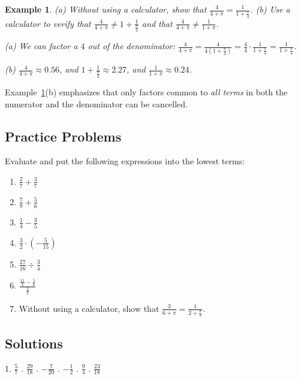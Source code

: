 \documentclass[11pt]{book}               %
\newtheorem{example}{Example}
\begin{document}
\begin{example}\label{dontcancle}
(a) Without using a calculator, show that $\frac{4}{4+\pi}=\frac{1}{1+\frac{\pi}{4}}$. (b) Use a calculator to verify that $\frac{4}{4+\pi}\neq 1 + \displaystyle\frac{1}{\frac{\pi}{4}}$ and that $\frac{4}{4+\pi}\neq\frac{1}{1+\pi}$.

\normalfont
(a) We can factor a $4$ out of the denominator: $\frac{4}{4+\pi}=\frac{4}{4\left(1+\frac{\pi}{4}\right)}=\frac{4}{4}\cdot\frac{1}{1+\frac{\pi}{4}} = \frac{1}{1+\frac{\pi}{4}}$.

(b) $\frac{4}{4+\pi}\approx 0.56$, and $1+\frac{1}{\frac{\pi}{4}}\approx2.27$, and $\frac{1}{1+\pi}\approx0.24$.
\end{example}

Example~\ref{dontcancle}(b) emphasizes that only factors common to \emph{all terms} in both the numerator and the denominator can be cancelled.

\subsection{Practice Problems}

Evaluate and put the following expressions into the lowest terms:
\begin{enumerate}
\item $ \frac{2}{7} + \frac{3}{7} $ 
\item $ \frac{7}{9} + \frac{5}{6} $ 
\item $ \frac{1}{4} - \frac{3}{5} $ 
\item $ \frac{3}{2} \cdot \left(-\frac{5}{15}\right) $ 
\item $ \frac{27}{16} \div \frac{3}{4} $ 
\item $\displaystyle \frac{\frac{11}{4} - \frac{5}{6}}{\frac{3}{2}} $ 
\item Without using a calculator, show that $\frac{3}{6+\pi}=\frac{1}{2+\frac{\pi}{3}}$. %
\end{enumerate}


\subsection{Solutions}
1. $ \frac{5}{7} $ . $ \frac{29}{18} $ . $ -\frac{7}{20} $ . $ -\frac{1}{2} $ . $ \frac{9}{4} $ . $ \frac{23}{18} $

\newpage
\label{section-integer_exponents}
\end{document}
